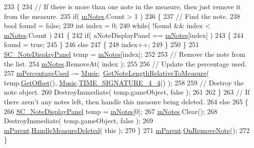 \begin{DoxyCode}
233     \{
234         \textcolor{comment}{// If there is more than one note in the measure, then just remove it from the measure.}
235         \textcolor{keywordflow}{if}( \hyperlink{group___s_c___m_d_p_priv_var_gaf8a533bce87e58d8f7a1da88f476ac6f}{mNotes}.Count > 1 )
236         \{
237             \textcolor{comment}{// Find the note.}
238             \textcolor{keywordtype}{bool} found = \textcolor{keyword}{false};
239             \textcolor{keywordtype}{int} index = 0;
240             \textcolor{keywordflow}{while}( !found && index < \hyperlink{group___s_c___m_d_p_priv_var_gaf8a533bce87e58d8f7a1da88f476ac6f}{mNotes}.Count )
241             \{
242                 \textcolor{keywordflow}{if}( aNoteDisplayPanel == \hyperlink{group___s_c___m_d_p_priv_var_gaf8a533bce87e58d8f7a1da88f476ac6f}{mNotes}[index] )
243                 \{
244                     found = \textcolor{keyword}{true};
245                 \}
246                 \textcolor{keywordflow}{else}
247                 \{
248                     index++;
249                 \}
250             \}
251             \hyperlink{class_s_c___note_display_panel}{SC\_NoteDisplayPanel} temp = \hyperlink{group___s_c___m_d_p_priv_var_gaf8a533bce87e58d8f7a1da88f476ac6f}{mNotes}[index];
252 
253             \textcolor{comment}{// Remove the note from the list.}
254             \hyperlink{group___s_c___m_d_p_priv_var_gaf8a533bce87e58d8f7a1da88f476ac6f}{mNotes}.RemoveAt( index );
255 
256             \textcolor{comment}{// Update the percentage used.}
257             \hyperlink{group___s_c___m_d_p_priv_var_ga7567e9001016a06d950b9d0cc9e1d905}{mPercentageUsed} -= \hyperlink{class_music}{Music}.
      \hyperlink{group___music_stat_func_ga91e290b48ad2289493ba4421308abe49}{GetNoteLengthRelativeToMeasure}( temp.\hyperlink{group___s_c___n_d_p_unity_ga371654221730812200062322c8a3e750}{GetOffset}(), 
      \hyperlink{class_music}{Music}.\hyperlink{group___music_stat_func_gac95af323eef7511543c799154e1c29fd}{TIME\_SIGNATURE\_4\_4}() );
258 
259             \textcolor{comment}{// Destroy the note object.}
260             DestroyImmediate( temp.gameObject, \textcolor{keyword}{false} );
261 
262         \}
263         \textcolor{comment}{// If there aren't any notes left, then handle this measure being deleted.}
264         \textcolor{keywordflow}{else}
265         \{
266             \hyperlink{class_s_c___note_display_panel}{SC\_NoteDisplayPanel} temp = \hyperlink{group___s_c___m_d_p_priv_var_gaf8a533bce87e58d8f7a1da88f476ac6f}{mNotes}[0];
267             \hyperlink{group___s_c___m_d_p_priv_var_gaf8a533bce87e58d8f7a1da88f476ac6f}{mNotes}.Clear();
268             DestroyImmediate( temp.gameObject, \textcolor{keyword}{false} );
269             \hyperlink{group___s_c___m_d_p_priv_var_ga6f22ae359dd68605a8b2fd961ced96b5}{mParent}.\hyperlink{group___s_c___n_d_c_handlers_ga40ffb2c779af43930924348c265c9e09}{HandleMeasureDeleted}( \textcolor{keyword}{this} );
270         \}
271         \hyperlink{group___s_c___m_d_p_priv_var_ga6f22ae359dd68605a8b2fd961ced96b5}{mParent}.\hyperlink{group___s_c___n_d_c_handlers_ga6dbbf12e55681d13f43e489dd4a100dc}{OnRemoveNote}();
272     \}
\end{DoxyCode}
